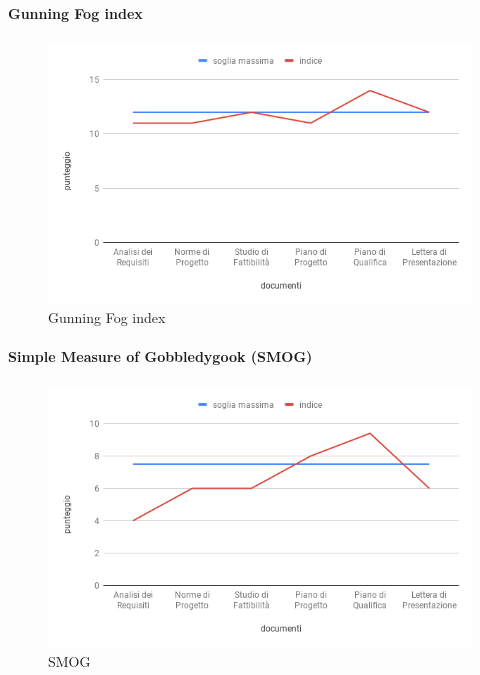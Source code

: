 \paragraph{Gunning Fog index}
\hspace{15cm}
\begin{figure}[h!]
	\centering
	\includegraphics[scale=0.5]{GunningFogIndex.png}
	\caption{Gunning Fog index}

\end{figure}
\paragraph{Simple Measure of Gobbledygook (SMOG)}
\hspace{15cm}
\begin{figure}[h!]
	\centering
	\includegraphics[scale=0.5]{Smog.png}
	\caption{SMOG}
\end{figure}
\clearpage
